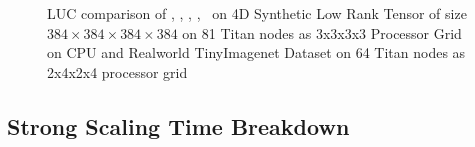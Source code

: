\begin{figure}
\caption{LUC comparison of \MU, \HALS, \BPP, \ADMM, \Nestrov\ on 4D Synthetic Low Rank Tensor of size $384 \times 384 \times 384 \times 384$ on 81 Titan nodes as 3x3x3x3 Processor Grid on CPU and Realworld TinyImagenet Dataset on 64 Titan nodes as 2x4x2x4 processor grid}
\label{fig:luccomp}
\end{figure}

\subsection{Strong Scaling Time Breakdown}


